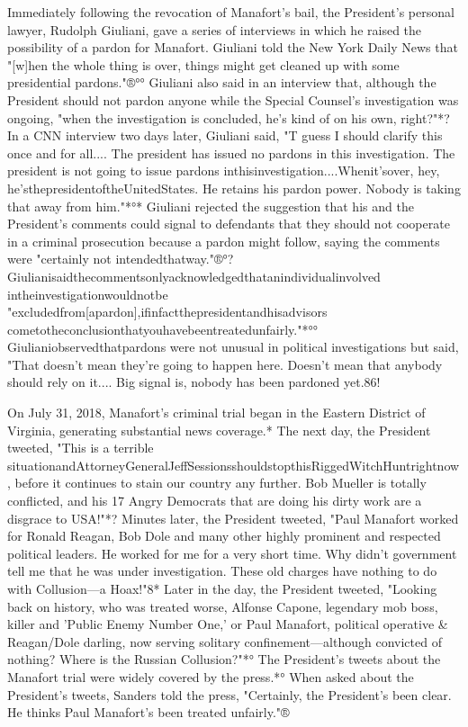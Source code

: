 Immediately following the revocation of Manafort's bail, the President's personal lawyer, Rudolph Giuliani, gave a series of interviews in which he raised the possibility of a pardon for Manafort.
Giuliani told the New York Daily News that "[w]hen the whole thing is over, things might get cleaned up with some presidential pardons."®°°
Giuliani also said in an interview that, although the President should not pardon anyone while the Special Counsel's investigation was ongoing, "when the investigation is concluded, he's kind of on his own, right?"*?
In a CNN interview two days later, Giuliani said, "T guess I should clarify this once and for all....
The president has issued no pardons in this investigation.
The president is not going to issue pardons inthisinvestigation....Whenit'sover, hey, he'sthepresidentoftheUnitedStates.
He retains his pardon power.
Nobody is taking that away from him."*°*
Giuliani rejected the suggestion that his and the President's comments could signal to defendants that they should not cooperate in a criminal prosecution because a pardon might follow, saying the comments were "certainly not intendedthatway."®°? Giulianisaidthecommentsonlyacknowledgedthatanindividualinvolved intheinvestigationwouldnotbe "excludedfrom[apardon],ifinfactthepresidentandhisadvisors
cometotheconclusionthatyouhavebeentreatedunfairly."*°°
Giulianiobservedthatpardons were not unusual in political investigations but said, "That doesn't mean they're going to happen here.
Doesn't mean that anybody should rely on it....
Big signal is, nobody has been pardoned yet.86!

On July 31, 2018, Manafort's criminal trial began in the Eastern District of Virginia, generating substantial news coverage.*
The next day, the President tweeted, "This is a terrible situationandAttorneyGeneralJeffSessionsshouldstopthisRiggedWitchHuntrightnow, before it continues to stain our country any further.
Bob Mueller is totally conflicted, and his 17 Angry Democrats that are doing his dirty work are a disgrace to USA!"*?
Minutes later, the President tweeted, "Paul Manafort worked for Ronald Reagan, Bob Dole and many other highly prominent and respected political leaders.
He worked for me for a very short time.
Why didn't government tell me that he was under investigation.
These old charges have nothing to do with Collusion—a Hoax!"8*
Later in the day, the President tweeted, "Looking back on history, who was treated worse, Alfonse Capone, legendary mob boss, killer and 'Public Enemy Number One,' or Paul Manafort, political operative & Reagan/Dole darling, now serving solitary confinement—although convicted of nothing?
Where is the Russian Collusion?"*°
The President's tweets about the Manafort trial were widely covered by the press.*°
When asked about the President's tweets, Sanders told the press, "Certainly, the President's been clear.
He thinks Paul Manafort's been treated unfairly."®%

